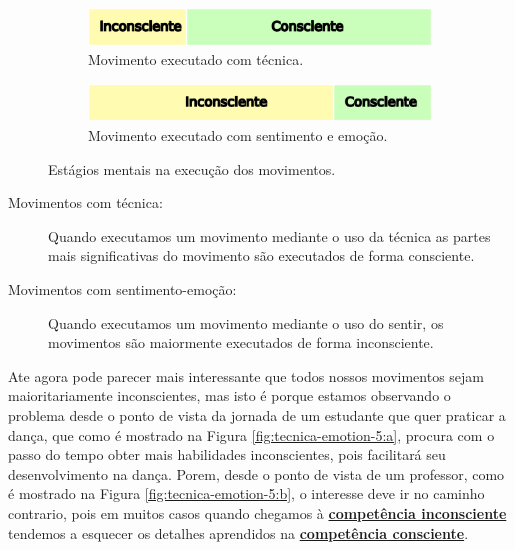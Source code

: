\begin{figure}[ht]
\centering
    \begin{subfigure}[t]{.48\textwidth}
      \centering
      \includegraphics[width=.975\linewidth]{chapters/cap-musicalidade-tecnica/tecnica-emotion-4a}  
      \caption{Movimento executado com técnica.}
      \label{fig:tecnica-emotion-4:a}
    \end{subfigure}
    \hfill
    \begin{subfigure}[t]{.48\textwidth}
      \centering
      \includegraphics[width=.975\linewidth]{chapters/cap-musicalidade-tecnica/tecnica-emotion-4b}  
      \caption{Movimento executado com sentimento e emoção.}
      \label{fig:tecnica-emotion-4:b}
    \end{subfigure}
    \caption{Estágios mentais na execução dos movimentos.}
    \label{fig:tecnica-emotion-4}
\end{figure}
\begin{description}
\item [Movimentos com técnica:] Quando executamos um movimento mediante o uso da técnica 
as partes mais significativas do movimento são executados de forma consciente.
\item [Movimentos com sentimento-emoção:] Quando executamos um movimento mediante o uso do sentir, 
os movimentos são maiormente executados de forma inconsciente.
\end{description}
Ate agora pode parecer mais interessante que todos nossos movimentos sejam maioritariamente inconscientes,
mas isto é porque estamos observando o problema desde o ponto de vista da jornada de um estudante
que quer praticar a dança, que como é mostrado na Figura \ref{fig:tecnica-emotion-5:a},
procura com o passo do tempo obter mais habilidades inconscientes,
pois facilitará seu desenvolvimento na dança.
Porem, desde o ponto de vista de um professor,
como é mostrado na Figura \ref{fig:tecnica-emotion-5:b}, 
o interesse deve ir no caminho contrario,
pois em muitos casos quando chegamos à \hyperref[ref:CompetenciaInconsciente]{\textbf{competência inconsciente}}
tendemos a esquecer os detalhes aprendidos na \hyperref[ref:CompetenciaConsciente]{\textbf{competência consciente}}.
